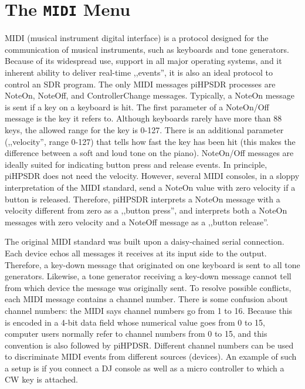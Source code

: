 \documentclass[12pt]{book}
\def\pH{pi\-HPSDR }
\begin{document}
\section{The \texttt{MIDI} Menu}
\label{sec:midimenu}
MIDI (musical instrument digital interface) is a protocol designed for the communication of
musical instruments, such as keyboards and tone generators. Because of its widespread use,
support in all major operating systems, and it inherent ability to deliver real-time ,,events'',
it is also an ideal protocol to control an SDR program. The only MIDI messages \pH processes
are NoteOn, NoteOff, and ControllerChange messages. Typically, a NoteOn message is sent if
a key on a keyboard is hit. The first parameter of a NoteOn/Off message is the key
it refers to. Although keyboards rarely have more than 88 keys, the allowed range for
the key is 0-127. There is an additional parameter (,,velocity'', range 0-127) that tells how
fast the key has been hit (this makes the difference between a soft and loud tone on the piano).
NoteOn/Off messages are ideally suited for indicating button press and release events. In principle,
\pH does not need the velocity. However, several MIDI consoles, in a sloppy interpretation of
the MIDI standard, send a NoteOn value with zero velocity if a button is released. Therefore,
\pH interprets a NoteOn message with a velocity different from zero as a ,,button press'',
and interprets both a NoteOn messages with zero velocity and a NoteOff message as a ,,button release''.

The original MIDI standard was built upon a daisy-chained serial connection. Each device
echos all messages it receives at its input side to the output. Therefore, a key-down
message that originated on one keyboard is sent to all tone generators. Likewise, a tone
generator receiving a key-down message cannot tell from which device the message
was originally sent. To resolve possible conflicts, each MIDI message contains a channel
number. There is some confusion about channel numbers: the MIDI says channel numbers
go from 1 to 16. Because this is encoded in a 4-bit data field whose numerical value
goes from 0 to 15, computer users normally refer to channel numbers from 0 to 15,
and this convention is also followed by piHPDSR. Different channel numbers can be used
to discriminate MIDI events from different sources (devices). An example of such a setup
is if you connect a DJ console as well as a micro controller to which a CW key is attached.
\end{document}
